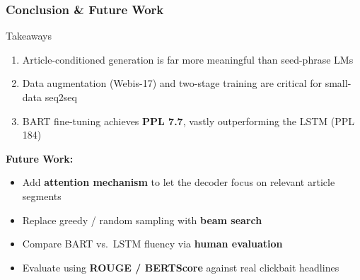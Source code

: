 \documentclass{beamer}
\begin{document}
\begin{frame}
\frametitle{Conclusion \& Future Work}

\begin{block}{Takeaways}
\begin{enumerate}
    \item Article-conditioned generation is far more meaningful than seed-phrase LMs
    \item Data augmentation (Webis-17) and two-stage training are critical for small-data seq2seq
    \item BART fine-tuning achieves \textbf{PPL 7.7}, vastly outperforming the LSTM (PPL 184)
\end{enumerate}
\end{block}

\vspace{0.3cm}

\textbf{Future Work:}
\begin{itemize}
    \item Add \textbf{attention mechanism} to let the decoder focus on relevant article segments
    \item Replace greedy / random sampling with \textbf{beam search}
    \item Compare BART vs.\ LSTM fluency via \textbf{human evaluation}
    \item Evaluate using \textbf{ROUGE / BERTScore} against real clickbait headlines
\end{itemize}

\end{frame}
\end{document}
